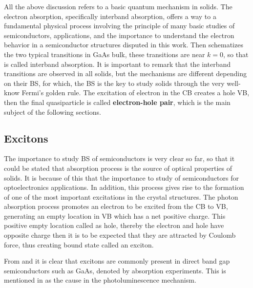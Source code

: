 All the above discussion refers to a basic quantum mechanism in solids. The electron absorption, specifically interband absorption, offers a way to a fundamental physical process  involving the principle of many basic studies of semiconductors, applications, and the importance to understand the electron behavior in a semiconductor structures disputed in this work. Then  schematizes the two typical transitions in GaAs bulk, these transitions are near  $k=0$, so that is called interband absorption. It is important to remark that the interband transitions are observed in all solids, but the mechanisms are different depending on their BS, for which,   the BS is the key to study solids  through the very well-know Fermi's golden rule. The excitation of electron in the CB creates a hole VB, then the  final quasiparticle is called \textbf{electron-hole pair}, which is the main subject of the following sections.


\subsection{Excitons}
\label{subsec:chapter-1-excitons}
\vspace{-10mm}
The importance to study \gls{BS} of semiconductors is very clear so far, so that it could be stated that absorption process is the source of optical properties of solids. It is because of this that the importance to study of semiconductors for optoelectronics applications. In addition, this process gives rise to the formation of one of the most important excitations in the crystal structures. The photon absorption process promotes an electron to be excited from  the \gls{CB} to \gls{VB}, generating an empty location in \gls{VB} which has a net positive charge. This positive empty location called as hole, thereby the electron and hole have opposite charge then it is to be expected that they are attracted by Coulomb force, thus creating bound state called an exciton\cite{leonard2017exciton}. 

From  and   it is clear that excitons are commonly present in direct band gap semiconductors such as GaAs, denoted by absorption experiments. This is  mentioned in  as the cause in the photoluminescence mechanism.

